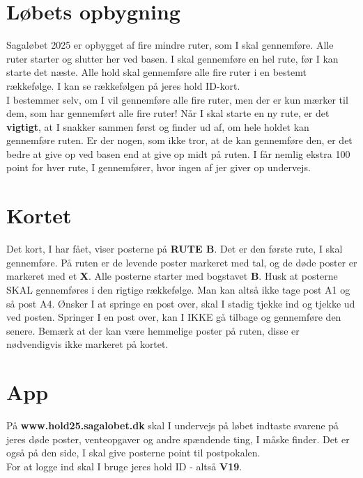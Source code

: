 \section{Løbets opbygning}
Sagaløbet 2025 er opbygget af fire mindre ruter, som I skal gennemføre. Alle ruter starter og slutter her ved basen. I skal gennemføre en hel rute, før I kan starte det næste. Alle hold skal gennemføre alle fire ruter i en bestemt rækkefølge. I kan se rækkefølgen på jeres hold ID-kort.\\\newline
I bestemmer selv, om I vil gennemføre alle fire ruter, men der er kun mærker til dem, som har gennemført alle fire ruter! Når I skal starte en ny rute, er det \textbf{vigtigt}, at I snakker sammen først og finder ud af, om hele holdet kan gennemføre ruten. Er der nogen, som ikke tror, at de kan gennemføre den, er det bedre at give op ved basen end at give op midt på ruten. I får nemlig ekstra 100 point for hver rute, I gennemfører, hvor ingen af jer giver op undervejs.\\
\section{Kortet}
Det kort, I har fået, viser posterne på \textbf{RUTE B}. Det er den første rute, I skal gennemføre. På ruten er de levende poster markeret med tal, og de døde poster er markeret med et \textbf{X}. Alle posterne starter med bogstavet \textbf{B}. Husk at posterne SKAL gennemføres i den rigtige rækkefølge. Man kan altså ikke tage post A1 og så post A4. Ønsker I at springe en post over, skal I stadig tjekke ind og tjekke ud ved posten. Springer I en post over, kan I IKKE gå tilbage og gennemføre den senere. Bemærk at der kan være hemmelige poster på ruten, disse er nødvendigvis ikke markeret på kortet.
\section{App}
På \textbf{www.hold25.sagalobet.dk} skal I undervejs på løbet indtaste svarene på jeres døde poster, venteopgaver og andre spændende ting, I måske finder. Det er også på den side, I skal give posterne point til postpokalen.\\
For at logge ind skal I bruge jeres hold ID - altså \textbf{V19}.
\newpage
